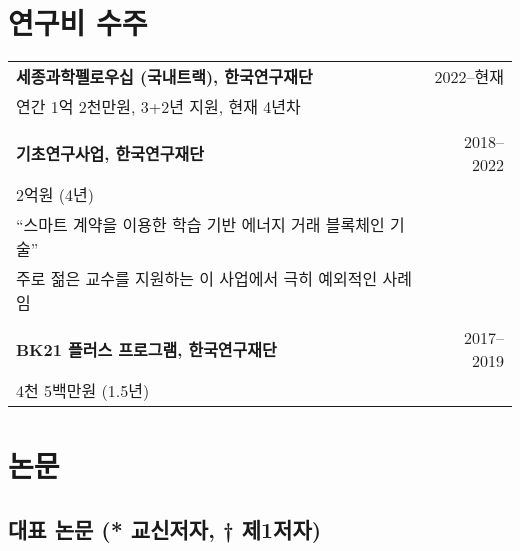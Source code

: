 \documentclass[11pt,a4paper]{article}
\begin{document}
\section{연구비 수주}

\begin{tabular}{p{14cm}r}
\textbf{세종과학펠로우십 (국내트랙), 한국연구재단} & 2022--현재 \\
연간 1억 2천만원, 3+2년 지원, 현재 4년차 & \\
\\
\textbf{기초연구사업, 한국연구재단} & 2018--2022 \\
2억원 (4년) & \\
``스마트 계약을 이용한 학습 기반 에너지 거래 블록체인 기술'' & \\
주로 젊은 교수를 지원하는 이 사업에서 극히 예외적인 사례임 & \\
\\
\textbf{BK21 플러스 프로그램, 한국연구재단} & 2017--2019 \\
4천 5백만원 (1.5년) & \\
\end{tabular}

\section{논문}

\subsection{대표 논문 (* 교신저자, † 제1저자)}
\end{document}
